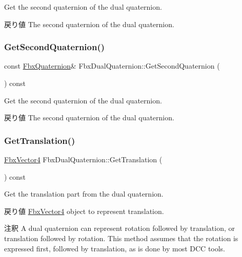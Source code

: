 Get the second quaternion of the dual quaternion. \begin{DoxyReturn}{戻り値}
The second quaternion of the dual quaternion. 
\end{DoxyReturn}
\mbox{\label{class_fbx_dual_quaternion_ae19fde6e0e620ba28caf66f0ebf43965}} 
\subsubsection{\texorpdfstring{Get\+Second\+Quaternion()}{GetSecondQuaternion()}\hspace{0.1cm}{\footnotesize\ttfamily [2/2]}}
{\footnotesize\ttfamily const \hyperlink{class_fbx_quaternion}{Fbx\+Quaternion}\& Fbx\+Dual\+Quaternion\+::\+Get\+Second\+Quaternion (\begin{DoxyParamCaption}{ }\end{DoxyParamCaption}) const}

Get the second quaternion of the dual quaternion. \begin{DoxyReturn}{戻り値}
The second quaternion of the dual quaternion. 
\end{DoxyReturn}
\mbox{\label{class_fbx_dual_quaternion_aba8ddeb900c37ca3a7de1b92b7f8312c}} 
\subsubsection{\texorpdfstring{Get\+Translation()}{GetTranslation()}}
{\footnotesize\ttfamily \hyperlink{class_fbx_vector4}{Fbx\+Vector4} Fbx\+Dual\+Quaternion\+::\+Get\+Translation (\begin{DoxyParamCaption}{ }\end{DoxyParamCaption}) const}

Get the translation part from the dual quaternion. \begin{DoxyReturn}{戻り値}
\hyperlink{class_fbx_vector4}{Fbx\+Vector4} object to represent translation. 
\end{DoxyReturn}
\begin{DoxyRemark}{注釈}
A dual quaternion can represent rotation followed by translation, or translation followed by rotation. This method assumes that the rotation is expressed first, followed by translation, as is done by most D\+CC tools. 
\end{DoxyRemark}
\mbox{\label{class_fbx_dual_quaternion_ab27c0b36e0c9387448f7b00af47428dd}} 
